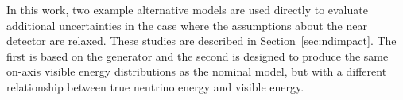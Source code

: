 


In this work, two example alternative models are used directly to evaluate additional uncertainties in the case where the assumptions about the near detector are relaxed. These studies are described in Section~\ref{sec:ndimpact}. The first is based on the  generator and the second is designed to produce the same on-axis visible energy distributions as the nominal model, but with a different relationship between true neutrino energy and visible energy.





